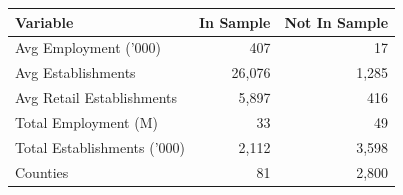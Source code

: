 \begin{tabular}[t]{lrr}
\toprule
Variable & In Sample & Not In Sample\\
\midrule
Avg Employment ('000) & 407 & 17 \\
Avg Establishments & 26,076 & 1,285 \\
Avg Retail Establishments & 5,897 & 416 \\
Total Employment (M) & 33 & 49 \\
Total Establishments ('000) & 2,112 & 3,598 \\
Counties & 81 & 2,800 \\
\bottomrule
\end{tabular}
